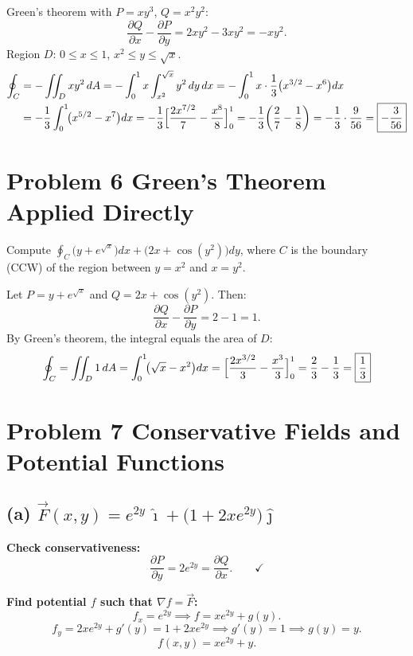 \documentclass[12pt]{article}
\begin{document}
Green's theorem with $P=xy^3$, $Q=x^2y^2$:
\[
  \frac{\partial Q}{\partial x}-\frac{\partial P}{\partial y}=2xy^2-3xy^2=-xy^2.
\]
Region $D$: $0\le x\le1$, $x^2\le y\le\sqrt{x}$.
\begin{align*}
  \oint_C
  &=-\iint_D xy^2\,dA
   =-\int_0^1 x\int_{x^2}^{\sqrt{x}}y^2\,dy\,dx
   =-\int_0^1 x\cdot\frac{1}{3}\bigl(x^{3/2}-x^6\bigr)dx\\
  &=-\frac{1}{3}\int_0^1\!\bigl(x^{5/2}-x^7\bigr)dx
   =-\frac{1}{3}\Bigl[\frac{2x^{7/2}}{7}-\frac{x^8}{8}\Bigr]_0^1
   =-\frac{1}{3}\!\left(\frac{2}{7}-\frac{1}{8}\right)
   =-\frac{1}{3}\cdot\frac{9}{56}
   =\boxed{-\dfrac{3}{56}}
\end{align*}

\section*{Problem 6 \quad Green's Theorem Applied Directly}

Compute $\displaystyle\oint_C\!\bigl(y+e^{\sqrt{x}}\bigr)dx+\bigl(2x+\cos(y^2)\bigr)dy$,
where $C$ is the boundary (CCW) of the region between $y=x^2$ and $x=y^2$.

Let $P=y+e^{\sqrt{x}}$ and $Q=2x+\cos(y^2)$. Then:
\[
  \frac{\partial Q}{\partial x}-\frac{\partial P}{\partial y}=2-1=1.
\]
By Green's theorem, the integral equals the area of $D$:
\[
  \oint_C=\iint_D 1\,dA=\int_0^1\!\bigl(\sqrt{x}-x^2\bigr)dx
         =\Bigl[\frac{2x^{3/2}}{3}-\frac{x^3}{3}\Bigr]_0^1
         =\frac{2}{3}-\frac{1}{3}=\boxed{\dfrac{1}{3}}
\]

\section*{Problem 7 \quad Conservative Fields and Potential Functions}

\subsection*{(a) $\vec{F}(x,y)=e^{2y}\,\hat{\imath}+\bigl(1+2xe^{2y}\bigr)\hat{\jmath}$}

\textbf{Check conservativeness:}
\[
  \frac{\partial P}{\partial y}=2e^{2y}=\frac{\partial Q}{\partial x}.\qquad\checkmark
\]

\textbf{Find potential $f$ such that $\nabla f=\vec{F}$:}
\[
  f_x=e^{2y}\implies f=xe^{2y}+g(y).
\]
\[
  f_y=2xe^{2y}+g'(y)=1+2xe^{2y}\implies g'(y)=1\implies g(y)=y.
\]
\[
  f(x,y)=xe^{2y}+y.
\]
\end{document}
